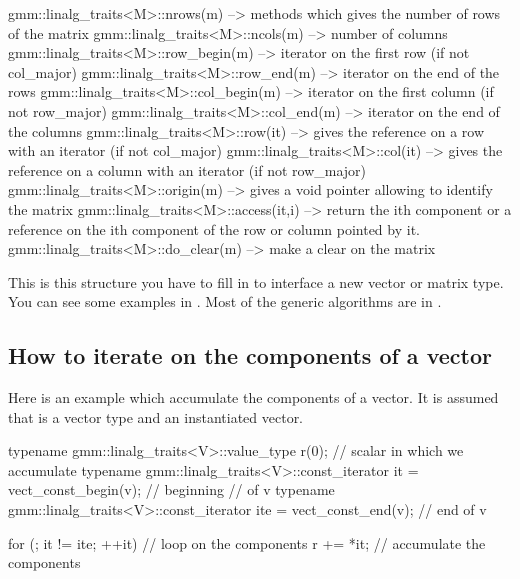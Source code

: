 \documentclass[11pt,a4paper]{article}
\begin{document}
\begin{cppcode}
  gmm::linalg_traits<M>::nrows(m)     --> methods which gives the number of rows of
                                          the matrix
  gmm::linalg_traits<M>::ncols(m)     --> number of columns
  gmm::linalg_traits<M>::row_begin(m) --> iterator on the first row (if not col_major)
  gmm::linalg_traits<M>::row_end(m)   --> iterator on the end of the rows
  gmm::linalg_traits<M>::col_begin(m) --> iterator on the first column
                                          (if not row_major)
  gmm::linalg_traits<M>::col_end(m)   --> iterator on the end of the columns
  gmm::linalg_traits<M>::row(it)      --> gives the reference on a row with an iterator
                                          (if not col_major)
  gmm::linalg_traits<M>::col(it)      --> gives the reference on a column with an
                                          iterator  (if not row_major)
  gmm::linalg_traits<M>::origin(m)    --> gives a void pointer allowing to identify
                                          the matrix
  gmm::linalg_traits<M>::access(it,i) --> return the ith component or a reference 
                                          on the ith component of the row or
                                          column pointed by it.
  gmm::linalg_traits<M>::do_clear(m)  --> make a clear on the matrix
\end{cppcode}

This is this structure you have to fill in to interface a new vector or matrix type. You can see some examples in  . Most of the generic algorithms are in  .


\subsection{How to iterate on the components of a vector}

Here is an example which accumulate the components of a vector. It is assumed that  is a vector type and  an instantiated vector.

\begin{cppcode}
  
  typename gmm::linalg_traits<V>::value_type r(0); // scalar in which we accumulate
  typename gmm::linalg_traits<V>::const_iterator it = vect_const_begin(v); // beginning 
                                                                           // of v
  typename gmm::linalg_traits<V>::const_iterator ite = vect_const_end(v); // end of v

  for (; it != ite; ++it)  // loop on the components
    r += *it;              // accumulate the components

\end{cppcode}
\end{document}
